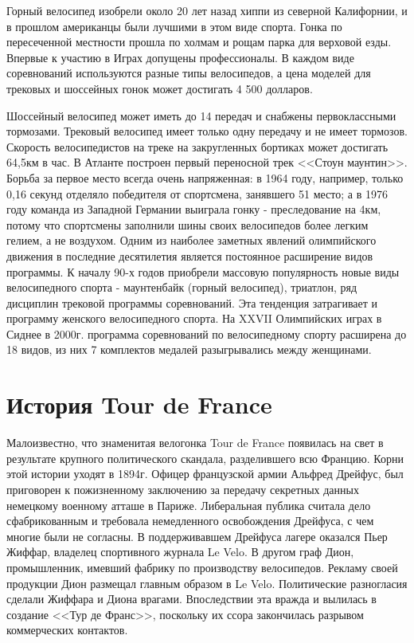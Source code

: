 \documentclass[a4paper,14pt]{extreport}
\begin{document}
Горный велосипед изобрели около 20 лет назад хиппи из северной Калифорнии, и в прошлом американцы были лучшими в этом виде спорта. Гонка по пересеченной местности прошла по холмам и рощам парка для верховой езды. Впервые к участию в Играх допущены профессионалы. В каждом виде соревнований используются разные типы велосипедов, а цена моделей для трековых и шоссейных гонок может достигать 4 500 долларов.

Шоссейный велосипед может иметь до 14 передач и снабжены первоклассными тормозами. Трековый велосипед имеет только одну передачу и не имеет тормозов. Скорость велосипедистов на треке на закругленных бортиках может достигать 64,5км в час. В Атланте построен первый переносной трек <<Стоун маунтин>>. Борьба за первое место всегда очень напряженная: в 1964 году, например, только 0,16 секунд отделяло победителя от спортсмена, занявшего 51 место; а в 1976 году команда из Западной Германии выиграла гонку - преследование на 4км, потому что спортсмены заполнили шины своих велосипедов более легким гелием, а не воздухом. Одним из наиболее заметных явлений олимпийского движения в последние десятилетия является постоянное расширение видов программы. К началу 90-х годов приобрели массовую популярность новые виды велосипедного спорта - маунтенбайк (горный велосипед), триатлон, ряд дисциплин трековой программы соревнований. Эта тенденция затрагивает и программу женского велосипедного спорта. На XXVII Олимпийских играх в Сиднее в 2000г. программа соревнований по велосипедному спорту расширена до 18 видов, из них 7 комплектов медалей разыгрывались между женщинами.

\chapter{История Tour de France}
Малоизвестно, что знаменитая велогонка Tour de France появилась на свет в результате крупного политического скандала, разделившего всю Францию. Корни этой истории уходят в 1894г. Офицер французской армии Альфред Дрейфус, был приговорен к пожизненному заключению за передачу секретных данных немецкому военному атташе в Париже. Либеральная публика считала дело сфабрикованным и требовала немедленного освобождения Дрейфуса, с чем многие были не согласны. В поддерживавшем Дрейфуса лагере оказался Пьер Жиффар, владелец спортивного журнала Le Velo. В другом граф Дион, промышленник, имевший фабрику по производству велосипедов. Рекламу своей продукции Дион размещал главным образом в Le Velo. Политические разногласия сделали Жиффара и Диона врагами. Впоследствии эта вражда и вылилась в создание <<Тур де Франс>>, поскольку их ссора закончилась разрывом коммерческих контактов.
\end{document}
